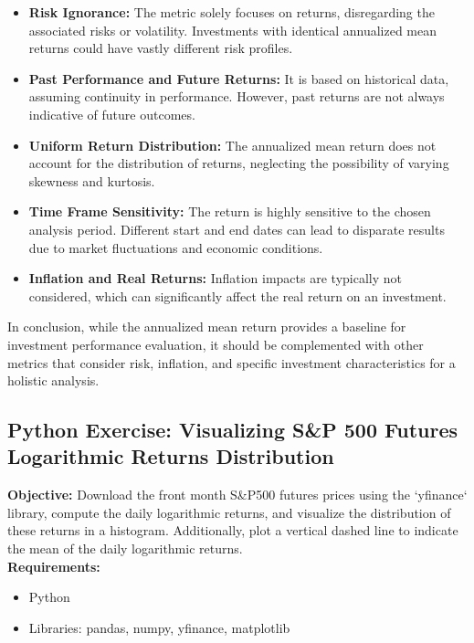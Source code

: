 \documentclass{article}
\begin{document}
\begin{itemize}
    \item \textbf{Risk Ignorance:} The metric solely focuses on returns, disregarding the associated risks or volatility. Investments with identical annualized mean returns could have vastly different risk profiles.
    \item \textbf{Past Performance and Future Returns:} It is based on historical data, assuming continuity in performance. However, past returns are not always indicative of future outcomes.
    \item \textbf{Uniform Return Distribution:} The annualized mean return does not account for the distribution of returns, neglecting the possibility of varying skewness and kurtosis.
    \item \textbf{Time Frame Sensitivity:} The return is highly sensitive to the chosen analysis period. Different start and end dates can lead to disparate results due to market fluctuations and economic conditions.
    \item \textbf{Inflation and Real Returns:} Inflation impacts are typically not considered, which can significantly affect the real return on an investment.
\end{itemize}

In conclusion, while the annualized mean return provides a baseline for investment performance evaluation, it should be complemented with other metrics that consider risk, inflation, and specific investment characteristics for a holistic analysis.

\subsection{Python Exercise: Visualizing S\&P 500 Futures Logarithmic Returns Distribution}

\textbf{Objective:} Download the front month S\&P500 futures prices using the `yfinance` library, compute the daily logarithmic returns, and visualize the distribution of these returns in a histogram. Additionally, plot a vertical dashed line to indicate the mean of the daily logarithmic returns. \\

\textbf{Requirements:}
\begin{itemize}
    \item Python
    \item Libraries: pandas, numpy, yfinance, matplotlib
\end{itemize}
\end{document}
